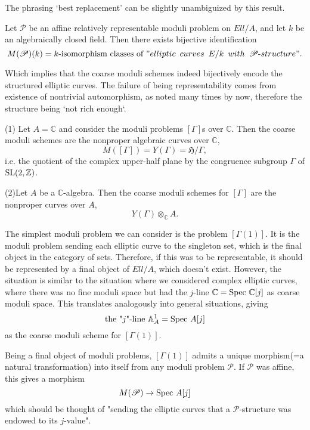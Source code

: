 \documentclass[a4paper,11pt]{article}
\begin{document}
The phrasing `best replacement' can be slightly unambiguized by this result.

\begin{prp}
Let $\mathcal{P}$ be an affine relatively representable moduli problem on $Ell/A$, and let $k$ be an algebraically closed field.
Then there exists bijective identification
\[
M(\mathcal{P})(k) = k\textnormal{-isomorphism classes of } "elliptic \enskip curves \enskip E/k \enskip with \enskip \mathcal{P}\textnormal{-}structure".
\]
\end{prp}

Which implies that the coarse moduli schemes indeed bijectively encode the structured elliptic curves.
The failure of being representability comes from existence of nontrivial automorphism, as noted many times by now, therefore the structure being `not rich enough`.

\begin{exm}\label{c}
(1) Let $A=\mathbb{C}$ and consider the moduli problems $[\Gamma]$s over $\mathbb{C}$.
Then the coarse moduli schemes are the nonproper algebraic curves over $\mathbb{C}$,
\[
M([\Gamma])=Y(\Gamma)=\mathfrak{H}/\Gamma,
\]
i.e. the quotient of the complex upper-half plane by the congruence subgroup $\Gamma$ of $\textnormal{SL}(2,\mathbb{Z})$.

(2)Let $A$ be a $\mathbb{C}$-algebra.
Then the coarse moduli schemes for $[\Gamma]$ are the nonproper curves over $A$,
\[
Y(\Gamma) \otimes_\mathbb{C} A.
\]

\end{exm}

The simplest moduli problem we can consider is the problem $[\Gamma(1)]$.
It is the moduli problem sending each elliptic curve to the singleton set, which is the final object in the category of sets.
Therefore, if this was to be representable, it should be represented by a final object of $Ell/A$, which doesn't exist.
However, the situation is similar to the situation where we considered complex elliptic curves, where there was no fine moduli space but had the $j$-line $\mathbb{C}=\textnormal{Spec }\mathbb{C}[j]$ as coarse moduli space.
This translates analogously into general situations, giving
\[
\textnormal{the "}j \textnormal{"-line } \mathbb{A}^1_A=\textnormal{Spec }A[j]
\]
as the coarse moduli scheme for $[\Gamma(1)]$.

Being a final object of moduli problems, $[\Gamma(1)]$ admits a unique morphism(=a natural transformation) into itself from any moduli problem $\mathcal{P}$.
If $\mathcal{P}$ was affine, this gives a morphism
\[
M(\mathcal{P}) \to \textnormal{Spec }A[j]
\]
which should be thought of "sending the elliptic curves that a $\mathcal{P}$-structure was endowed to its $j$-value".
\end{document}
